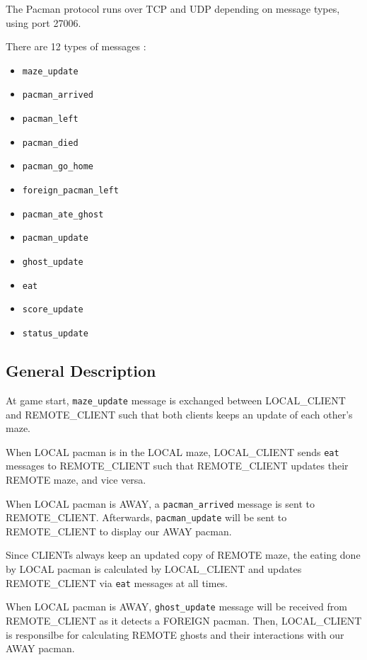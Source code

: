 \documentclass[]{article}
\providecommand{\tightlist}{%
  \setlength{\itemsep}{0pt}\setlength{\parskip}{0pt}}
\begin{document}
The Pacman protocol runs over TCP and UDP depending on message types,
using port 27006.

There are 12 types of messages :

\begin{itemize}
\tightlist
\item
  \texttt{maze\_update}
\item
  \texttt{pacman\_arrived}
\item
  \texttt{pacman\_left}
\item
  \texttt{pacman\_died}
\item
  \texttt{pacman\_go\_home}
\item
  \texttt{foreign\_pacman\_left}
\item
  \texttt{pacman\_ate\_ghost}
\item
  \texttt{pacman\_update}
\item
  \texttt{ghost\_update}
\item
  \texttt{eat}
\item
  \texttt{score\_update}
\item
  \texttt{status\_update}
\end{itemize}

\hypertarget{general-description}{%
\subsection{General Description}\label{general-description}}

At game start, \texttt{maze\_update} message is exchanged between
LOCAL\_CLIENT and REMOTE\_CLIENT such that both clients keeps an update
of each other's maze.

When LOCAL pacman is in the LOCAL maze, LOCAL\_CLIENT sends \texttt{eat}
messages to REMOTE\_CLIENT such that REMOTE\_CLIENT updates their REMOTE
maze, and vice versa.

When LOCAL pacman is AWAY, a \texttt{pacman\_arrived} message is sent to
REMOTE\_CLIENT. Afterwards, \texttt{pacman\_update} will be sent to
REMOTE\_CLIENT to display our AWAY pacman.

Since CLIENTs always keep an updated copy of REMOTE maze, the eating
done by LOCAL pacman is calculated by LOCAL\_CLIENT and updates
REMOTE\_CLIENT via \texttt{eat} messages at all times.

When LOCAL pacman is AWAY, \texttt{ghost\_update} message will be
received from REMOTE\_CLIENT as it detects a FOREIGN pacman. Then,
LOCAL\_CLIENT is responsilbe for calculating REMOTE ghosts and their
interactions with our AWAY pacman.
\end{document}
